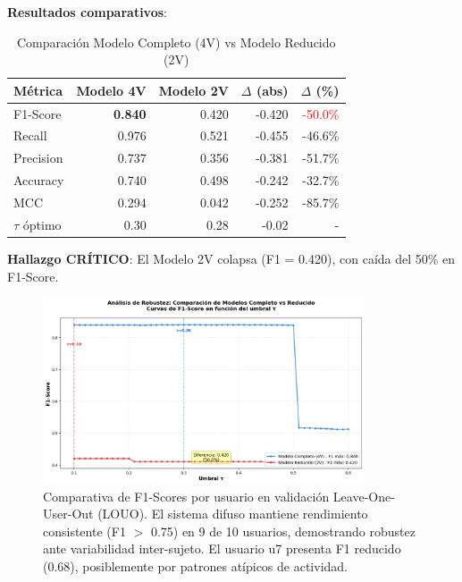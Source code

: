 \documentclass[12pt,letterpaper,twoside]{report}
\begin{document}
\begin{calculobox}
\begin{calculobox}
\textbf{Resultados comparativos}:

\begin{table}[H]
\centering
\caption{Comparación Modelo Completo (4V) vs Modelo Reducido (2V)}
\label{tab:robustness_4v_2v}
\begin{tabular}{@{}lrrrr@{}}
\toprule
\textbf{Métrica} & \textbf{Modelo 4V} & \textbf{Modelo 2V} & \textbf{$\Delta$ (abs)} & \textbf{$\Delta$ (\%)} \\
\midrule
F1-Score         & \textbf{0.840} & 0.420 & -0.420 & \textcolor{red}{-50.0\%} \\
Recall           & 0.976          & 0.521 & -0.455 & -46.6\% \\
Precision        & 0.737          & 0.356 & -0.381 & -51.7\% \\
Accuracy         & 0.740          & 0.498 & -0.242 & -32.7\% \\
MCC              & 0.294          & 0.042 & -0.252 & -85.7\% \\
$\tau$ óptimo    & 0.30           & 0.28  & -0.02  & - \\
\bottomrule
\end{tabular}
\end{table}

\textbf{Hallazgo CRÍTICO}: El Modelo 2V colapsa (F1 = 0.420), con caída del 50\% en F1-Score.
\end{calculobox}

\begin{figure}[htbp]
\centering
\includegraphics[width=0.85\textwidth]{figuras/comparativa_f1_scores.png}
\caption{Comparativa de F1-Scores por usuario en validación Leave-One-User-Out (LOUO). El sistema difuso mantiene rendimiento consistente (F1 $>$ 0.75) en 9 de 10 usuarios, demostrando robustez ante variabilidad inter-sujeto. El usuario u7 presenta F1 reducido (0.68), posiblemente por patrones atípicos de actividad.}
\label{fig:comparativa_f1_louo}
\end{figure}


\end{calculobox}
\end{document}

